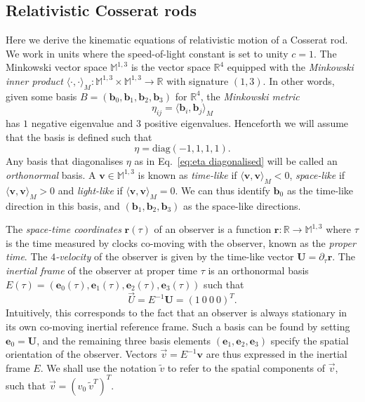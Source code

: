 \subsection{Relativistic Cosserat rods} \label{sec:Relativistic Cosserat rods}

Here we derive the kinematic equations of relativistic motion of a Cosserat rod. We work in units where the speed-of-light constant is set to unity $c= 1$. The Minkowski vector space $\mathbb{M}^{1,3}$ is the vector space $\mathbb{R}^4$ equipped with the \textit{Minkowski inner product} $\langle \cdot, \cdot \rangle_M : \mathbb{M}^{1,3} \times \mathbb{M}^{1,3} \to \mathbb{R}$ with signature $(1, 3)$. In other words, given some basis $B = (\mathbf{b}_0, \mathbf{b}_1, \mathbf{b}_2, \mathbf{b}_3)$ for $\mathbb{R}^4$, the \textit{Minkowski metric}
\begin{equation}
\eta_{ij} = \langle \mathbf{b}_i, \mathbf{b}_j \rangle_M
\end{equation}
has $1$ negative eigenvalue and $3$ positive eigenvalues. Henceforth we will assume that the basis is defined such that
\begin{equation} \label{eq:eta diagonalised}
\eta = \text{diag}(-1, 1, 1, 1).
\end{equation}
Any basis that diagonalises $\eta$ as in Eq.~\ref{eq:eta diagonalised} will be called an \textit{orthonormal} basis. A $\mathbf{v} \in \mathbb{M}^{1,3}$ is known as \textit{time-like} if $\langle \mathbf{v}, \mathbf{v} \rangle_M < 0$, \textit{space-like} if $\langle \mathbf{v}, \mathbf{v} \rangle_M > 0$ and \textit{light-like} if $\langle \mathbf{v}, \mathbf{v} \rangle_M = 0$. We can thus identify $\mathbf{b}_0$ as the time-like direction in this basis, and $(\mathbf{b}_1, \mathbf{b}_2, \mathbf{b}_3)$ as the space-like directions.

The \textit{space-time coordinates} $\mathbf{r}(\tau)$ of an observer is a function $\mathbf{r} : \mathbb{R} \to \mathbb{M}^{1,3}$ where $\tau$ is the time measured by clocks co-moving with the observer, known as the \textit{proper time}. The \textit{$4$-velocity} of the observer is given by the time-like vector $\mathbf{U} = \partial_\tau \mathbf{r}$. The \textit{inertial frame} of the observer at proper time $\tau$ is an orthonormal basis $E(\tau) = (\mathbf{e}_0(\tau), \mathbf{e}_1(\tau), \mathbf{e}_2(\tau), \mathbf{e}_3(\tau))$ such that
\begin{equation}
\vec{U} = E^{-1} \mathbf{U} = (1\ 0\ 0\ 0)^T.
\end{equation}
Intuitively, this corresponds to the fact that an observer is always stationary in its own co-moving inertial reference frame. Such a basis can be found by setting $\mathbf{e}_0 = \mathbf{U}$, and the remaining three basis elements $(\mathbf{e}_1, \mathbf{e}_2, \mathbf{e}_3)$ specify the spatial orientation of the observer. Vectors $\vec{v} = E^{-1} \mathbf{v}$ are thus expressed in the inertial frame $E$. We shall use the notation $\tilde{v}$ to refer to the spatial components of $\vec{v}$, such that $\vec{v} = (v_0\ \tilde{v}^T)^T$.


